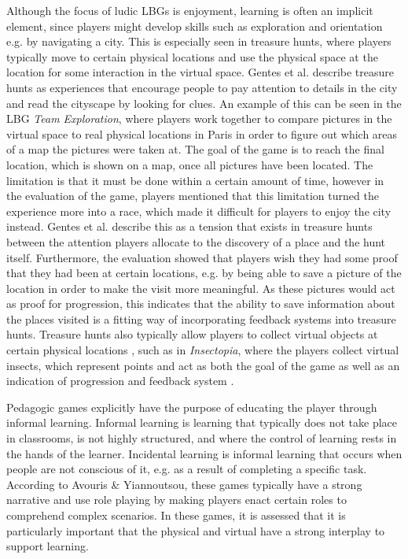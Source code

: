 Although the focus of ludic LBGs is enjoyment, learning is often an implicit element, since players might develop skills such as exploration and orientation e.g. by navigating a city. This is especially seen in treasure hunts, where players typically move to certain physical locations and use the physical space at the location for some interaction in the virtual space. Gentes et al. describe treasure hunts as experiences that encourage people to pay attention to details in the city and read the cityscape by looking for clues. An example of this can be seen in the LBG \textit{Team Exploration}, where players work together to compare pictures in the virtual space to real physical locations in Paris in order to figure out which areas of a map the pictures were taken at\cite{GamingOnTheMove}. The goal of the game is to reach the final location, which is shown on a map, once all pictures have been located. The limitation is that it must be done within a certain amount of time, however in the evaluation of the game, players mentioned that this limitation turned the experience more into a race, which made it difficult for players to enjoy the city instead. Gentes et al. describe this as a tension that exists in treasure hunts between the attention players allocate to the discovery of a place and the hunt itself\cite{GamingOnTheMove}. Furthermore, the evaluation showed that players wish they had some proof that they had been at certain locations, e.g. by being able to save a picture of the location in order to make the visit more meaningful. As these pictures would act as proof for progression, this indicates that the ability to save information about the places visited is a fitting way of incorporating feedback systems into treasure hunts. Treasure hunts also typically allow players to collect virtual objects at certain physical locations \cite{LBG_Review}, such as in \textit{Insectopia}, where the players collect virtual insects, which represent points and act as both the goal of the game as well as an indication of progression and feedback system \cite{Insectopia}.

Pedagogic games explicitly have the purpose of educating the player through informal learning\cite{LBG_Review}. Informal learning is learning that typically does not take place in classrooms, is not highly structured, and where the control of learning rests in the hands of the learner\cite{informallearning}. Incidental learning is informal learning that occurs when people are not conscious of it, e.g. as a result of completing a specific task\cite{informallearning}. According to Avouris \& Yiannoutsou, these games typically have a strong narrative and use role playing by making players enact certain roles to comprehend complex scenarios\cite{LBG_Review}. In these games, it is assessed that it is particularly important that the physical and virtual have a strong interplay to support learning.

